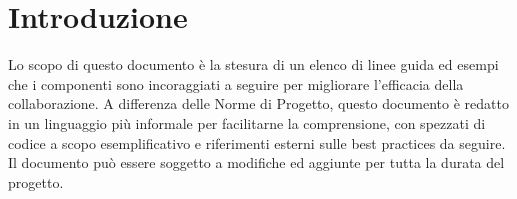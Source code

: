 \chapter{Introduzione}

Lo scopo di questo documento è la stesura di un elenco di linee guida ed esempi che i componenti sono incoraggiati a seguire per migliorare l'efficacia della collaborazione.
A differenza delle Norme di Progetto, questo documento è redatto in un linguaggio più informale per facilitarne la comprensione, con spezzati di codice a scopo esemplificativo e riferimenti esterni sulle best practices da seguire.\\
Il documento può essere soggetto a modifiche ed aggiunte per tutta la durata del progetto.
